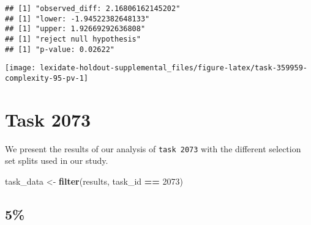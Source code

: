 \documentclass[
]{book}
\newenvironment{Shaded}{\begin{snugshade}}{\end{snugshade}}
\newcommand{\AttributeTok}[1]{\textcolor[rgb]{0.13,0.29,0.53}{#1}}
\newcommand{\DecValTok}[1]{\textcolor[rgb]{0.00,0.00,0.81}{#1}}
\newcommand{\FunctionTok}[1]{\textcolor[rgb]{0.13,0.29,0.53}{\textbf{#1}}}
\newcommand{\NormalTok}[1]{#1}
\newcommand{\OtherTok}[1]{\textcolor[rgb]{0.56,0.35,0.01}{#1}}
\newcommand{\SpecialCharTok}[1]{\textcolor[rgb]{0.81,0.36,0.00}{\textbf{#1}}}
\newcommand{\StringTok}[1]{\textcolor[rgb]{0.31,0.60,0.02}{#1}}
\begin{document}
\begin{Shaded}
\end{Shaded}

\begin{verbatim}
## [1] "observed_diff: 2.16806162145202"
## [1] "lower: -1.94522382648133"
## [1] "upper: 1.92669292636808"
## [1] "reject null hypothesis"
## [1] "p-value: 0.02622"
\end{verbatim}

\texttt{[image: lexidate-holdout-supplemental\_files/figure-latex/task-359959-complexity-95-pv-1]}

\hypertarget{task-2073}{%
\chapter{Task 2073}\label{task-2073}}

We present the results of our analysis of \texttt{task\ 2073} with the different selection set splits used in our study.

\begin{Shaded}
\begin{Highlighting}[]
\NormalTok{task\_data }\OtherTok{\textless{}{-}} \FunctionTok{filter}\NormalTok{(results, task\_id }\SpecialCharTok{==} \DecValTok{2073}\NormalTok{)}
\end{Highlighting}
\end{Shaded}

\hypertarget{section-40}{%
\section{5\%}\label{section-40}}
\end{document}
